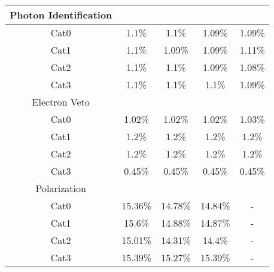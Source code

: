\begin{tabular}{c|c|c|c|c}
\hline\hline
Photon Identification  & \multicolumn{4}{l}{} \\ \hline
Cat0 & 1.1\% & 1.1\% & 1.09\% & 1.09\% \\
Cat1 & 1.1\% & 1.09\% & 1.09\% & 1.11\% \\
Cat2 & 1.1\% & 1.1\% & 1.09\% & 1.08\% \\
Cat3 & 1.1\% & 1.1\% & 1.1\% & 1.09\% \\
\hline\hline
Electron Veto  & \multicolumn{4}{l}{} \\ \hline
Cat0 & 1.02\% & 1.02\% & 1.02\% & 1.03\% \\
Cat1 & 1.2\% & 1.2\% & 1.2\% & 1.2\% \\
Cat2 & 1.2\% & 1.2\% & 1.2\% & 1.2\% \\
Cat3 & 0.45\% & 0.45\% & 0.45\% & 0.45\% \\
\hline\hline
Polarization  & \multicolumn{4}{l}{} \\ \hline
Cat0 & 15.36\% & 14.78\% & 14.84\% & - \\
Cat1 & 15.6\% & 14.88\% & 14.87\% & - \\
Cat2 & 15.01\% & 14.31\% & 14.4\% & - \\
Cat3 & 15.39\% & 15.27\% & 15.39\% & - \\
\hline\hline

\end{tabular}


